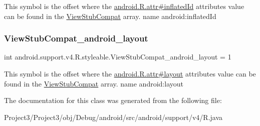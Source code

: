 This symbol is the offset where the \hyperlink{}{android.\+R.\+attr\#inflated\+Id} attribute\textquotesingle{}s value can be found in the \hyperlink{classandroid_1_1support_1_1v4_1_1R_1_1styleable_a1cd2d3a360da85e50068df345a364a59}{View\+Stub\+Compat} array.  name android\+:inflated\+Id \mbox{\label{classandroid_1_1support_1_1v4_1_1R_1_1styleable_af1b362398fc2f79e6599ea6bf0d712cc}} 
\subsubsection{\texorpdfstring{View\+Stub\+Compat\+\_\+android\+\_\+layout}{ViewStubCompat\_android\_layout}}
{\footnotesize\ttfamily int android.\+support.\+v4.\+R.\+styleable.\+View\+Stub\+Compat\+\_\+android\+\_\+layout = 1\hspace{0.3cm}{\ttfamily [static]}}

This symbol is the offset where the \hyperlink{}{android.\+R.\+attr\#layout} attribute\textquotesingle{}s value can be found in the \hyperlink{classandroid_1_1support_1_1v4_1_1R_1_1styleable_a1cd2d3a360da85e50068df345a364a59}{View\+Stub\+Compat} array.  name android\+:layout 

The documentation for this class was generated from the following file\+:\begin{DoxyCompactItemize}
\item 
Project3/\+Project3/obj/\+Debug/android/src/android/support/v4/R.\+java\end{DoxyCompactItemize}
